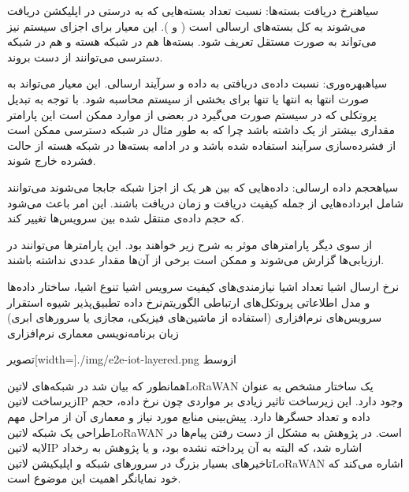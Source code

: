  ‌سیاه{نرخ دریافت بسته‌ها}: نسبت تعداد بسته‌هایی که به درستی در اپلیکشن دریافت می‌شوند به کل بسته‌های ارسالی است ( و ).
این معیار برای اجزای سیستم
نیز می‌تواند به صورت مستقل تعریف شود. بسته‌ها هم در شبکه هسته و هم در شبکه دسترسی می‌توانند از دست بروند.

 ‌سیاه{بهره‌وری}: نسبت داده‌ی دریافتی به داده و سرآیند ارسالی. این معیار می‌تواند به صورت انتها به انتها یا تنها برای بخشی
از سیستم محاسبه شود. با توجه به تبدیل پروتکلی که در سیستم صورت می‌گیرد در بعضی از موارد ممکن است این پارامتر مقداری
بیشتر از یک داشته باشد چرا که به طور مثال در شبکه دسترسی ممکن است از فشرده‌سازی سرآیند استفاده شده باشد و در ادامه بسته‌ها در شبکه هسته
از حالت فشرده خارج شوند.

 ‌سیاه{حجم داده ارسالی}: داده‌هایی که بین هر یک از اجزا شبکه جابجا می‌شوند می‌توانند شامل ابرداده‌هایی از جمله
کیفیت دریافت و زمان دریافت باشند. این امر باعث می‌شود که حجم داده‌ی منتقل شده بین سرویس‌ها تغییر کند.


از سوی دیگر پارامترهای موثر به شرح زیر خواهند بود. این پارامترها می‌توانند در ارزیابی‌ها گزارش می‌شوند و ممکن است برخی از آن‌ها
مقدار عددی نداشته باشند.

 نرخ ارسال اشیا
 تعداد اشیا
 نیازمندی‌های کیفیت سرویس اشیا
 تنوع اشیا، ساختار داده‌ها و مدل اطلاعاتی
 پروتکل‌های ارتباطی
 الگوریتم‌نرخ داده تطبیق‌پذیر
 شیوه استقرار سرویس‌های نرم‌افزاری (استفاده از ماشین‌های فیزیکی، مجازی یا سرورهای ابری)
 زبان برنامه‌نویسی
 معماری نرم‌افزاری

‌تصویر[width=\textwidth]{./img/e2e-iot-layered.png}
‌ازوسط


همانطور که بیان شد در شبکه‌های ‌لاتین{LoRaWAN} یک ساختار مشخص به عنوان زیرساخت ‌لاتین{IP} وجود دارد.
این زیرساخت تاثیر زیادی بر مواردی چون نرخ داده، حجم داده و تعداد حسگرها دارد. پیش‌بینی منابع مورد نیاز و معماری آن از مراحل مهم طراحی یک شبکه ‌لاتین{LoRaWAN} است.
در پژوهش  به مشکل از دست رفتن پیام‌ها در لایه ‌لاتین{IP} اشاره شد، که البته به آن پرداخته نشده بود،
و یا پژوهش  به رخداد تاخیرهای بسیار بزرگ در سرورهای شبکه و اپلیکیشن ‌لاتین{LoRaWAN} اشاره می‌کند
که خود نمایانگر اهمیت این موضوع است.

